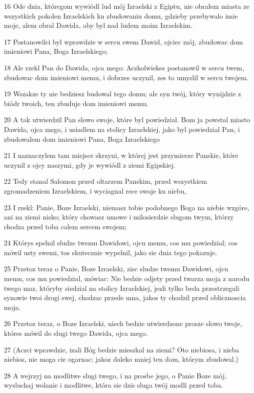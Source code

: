 \par 16 Ode dnia, któregom wywiódl lud mój Izraelski z Egiptu, nie obralem miasta ze wszystkich pokolen Izraelskich ku zbudowaniu domu, gdzieby przebywalo imie moje, alem obral Dawida, aby byl nad ludem moim Izraelskim.
\par 17 Postanowilci byl wprawdzie w sercu swem Dawid, ojciec mój, zbudowac dom imieniowi Pana, Boga Izraelskiego;
\par 18 Ale rzekl Pan do Dawida, ojca mego: Aczkolwiekes postanowil w sercu twem, zbudowac dom imieniowi memu, i dobrzes uczynil, zes to umyslil w sercu twojem.
\par 19 Wszakze ty nie bedziesz budowal tego domu; ale syn twój, który wynijdzie z biódr twoich, ten zbuduje dom imieniowi memu.
\par 20 A tak utwierdzil Pan slowo swoje, które byl powiedzial. Bom ja powstal miasto Dawida, ojca mego, i usiadlem na stolicy Izraelskiej, jako byl powiedzial Pan, i zbudowalem dom imieniowi Pana, Boga Izraelskiego
\par 21 I naznaczylem tam miejsce skrzyni, w której jest przymierze Panskie, które uczynil z ojcy naszymi, gdy je wywiódl z ziemi Egipskiej.
\par 22 Tedy stanal Salomon przed oltarzem Panskim, przed wszystkiem zgromadzeniem Izraelskiem, i wyciagnal rece swoje ku niebu,
\par 23 I rzekl: Panie, Boze Izraelski, niemasz tobie podobnego Boga na niebie wzgóre, ani na ziemi nisko; który chowasz umowe i milosierdzie slugom twym, którzy chodza przed toba calem sercem swojem;
\par 24 Którys spelnil sludze twemu Dawidowi, ojcu memu, cos mu powiedzial; cos mówil usty swemi, tos skutecznie wypelnil, jako sie dnia tego pokazuje.
\par 25 Przetoz teraz o Panie, Boze Izraelski, zisc sludze twemu Dawidowi, ojcu memu, cos mu powiedzial, mówiac: Nie bedzie odjety przed twarza moja z narodu twego maz, któryby siedzial na stolicy Izraelskiej, jezli tylko beda przestrzegali synowie twoi drogi swej, chodzac przede mna, jakos ty chodzil przed oblicznoscia moja.
\par 26 Przetoz teraz, o Boze Izraelski, niech bedzie utwierdzone prosze slowo twoje, któres mówil do slugi twego Dawida, ojca mego.
\par 27 (Aczci wprawdzie, izali Bóg bedzie mieszkal na ziemi? Oto niebiosa, i nieba niebios, nie moga cie ogarnac; jakoz daleko mniej ten dom, którym zbudowal.)
\par 28 A wejrzyj na modlitwe slugi twego, i na prosbe jego, o Panie Boze mój, wysluchaj wolanie i modlitwe, która sie dzis sluga twój modli przed toba.
